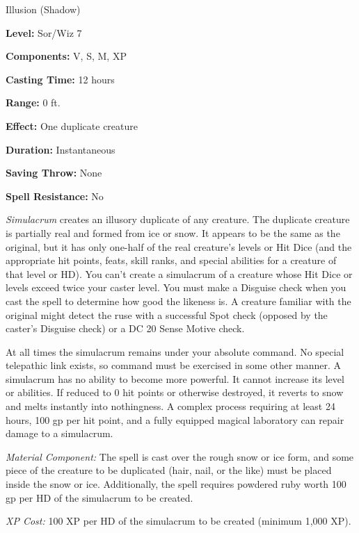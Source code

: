 
Illusion (Shadow)

\textbf{Level:} Sor/Wiz 7

\textbf{Components:} V, S, M, XP

\textbf{Casting Time:} 12 hours

\textbf{Range:} 0 ft.

\textbf{Effect:} One duplicate creature

\textbf{Duration:} Instantaneous

\textbf{Saving Throw:} None

\textbf{Spell Resistance:} No

\textit{Simulacrum} creates an illusory duplicate of any creature. The duplicate 
creature is partially real and formed from ice or snow. It appears to be the same 
as the original, but it has only one-half of the real creature's levels or Hit 
Dice (and the appropriate hit points, feats, skill ranks, and special abilities 
for a creature of that level or HD). You can't create a simulacrum of a creature 
whose Hit Dice or levels exceed twice your caster level. You must make a Disguise 
check when you cast the spell to determine how good the likeness is. A creature 
familiar with the original might detect the ruse with a successful Spot check (opposed 
by the caster's Disguise check) or a DC 20 Sense Motive check.

At all times the simulacrum remains under your absolute command. No special telepathic 
link exists, so command must be exercised in some other manner. A simulacrum has 
no ability to become more powerful. It cannot increase its level or abilities. 
If reduced to 0 hit points or otherwise destroyed, it reverts to snow and melts 
instantly into nothingness. A complex process requiring at least 24 hours, 100 
gp per hit point, and a fully equipped magical laboratory can repair damage to 
a simulacrum.

\textit{Material Component:} The spell is cast over the rough snow or ice form, 
and some piece of the creature to be duplicated (hair, nail, or the like) must 
be placed inside the snow or ice. Additionally, the spell requires powdered ruby 
worth 100 gp per HD of the simulacrum to be created.

\textit{XP Cost:} 100 XP per HD of the simulacrum to be created (minimum 1,000 
XP).

